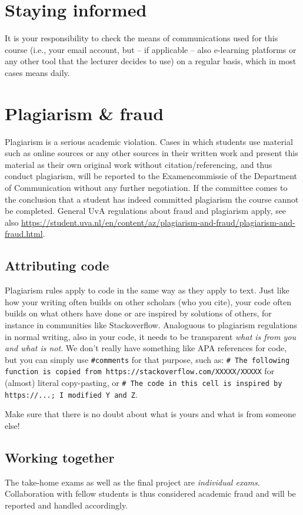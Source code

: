 \documentclass[a4paper,10pt,twocolumn]{report}
\begin{document}
\section{Staying informed}
It is your responsibility to check the means of communications used for this course (i.e., your email account, but -- if applicable -- also e-learning platforms or any other tool that the lecturer decides to use) on a regular basis, which in most cases means daily.

\section{Plagiarism \& fraud}
Plagiarism is a serious academic violation. Cases in which students use material such as online sources or any other sources in their written work and present this material as their own original work without citation/referencing, and thus conduct plagiarism, will be reported to the Examencommissie of the Department of Communication without any further negotiation. If the committee comes to the conclusion that a student has indeed committed plagiarism the course cannot be completed.
General UvA regulations about fraud and plagiarism apply, see also \url{https://student.uva.nl/en/content/az/plagiarism-and-fraud/plagiarism-and-fraud.html}.

\subsection{Attributing code}
Plagiarism rules apply to code in the same way as they apply to text. Just like how your writing often builds on other scholars (who you cite), your code often builds on what others have done or are inspired by solutions of others, for instance in communities like Stackoverflow. Analoguous to plagiarism regulations in normal writing, also in your code, it needs to be transparent \emph{what is from you and what is not}. We don't really have something like APA references for code, but you can simply use \texttt{\#comments} for that purpose, such as:
\texttt{\# The following function is copied from https://stackoverflow.com/XXXXX/XXXXX} for (almost) literal copy-pasting, or \texttt{\# The code in this cell is inspired by https://...; I modified Y and Z}. 

Make sure that there is no doubt about what is yours and what is from someone else!

\subsection{Working together}
The take-home exams as well as the final project are \emph{individual exams}. Collaboration with fellow students is thus considered academic fraud and will be reported and handled accordingly.
\end{document}
